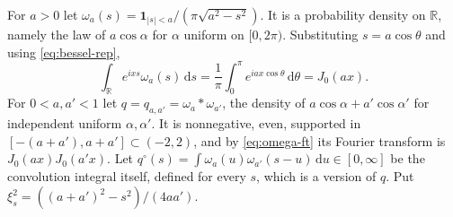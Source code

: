 \documentclass[preprint,12pt,a4paper]{elsarticle}
\theoremstyle{remark}
\newcommand{\R}{\mathbb R}
\newcommand{\dd}{\,\mathrm d}
\begin{document}
For $a>0$ let $\omega_a(s)=\boldsymbol1_{|s|<a}/(\pi\sqrt{a^2-s^2})$. It is
a probability density on $\R$, namely the law of $a\cos\alpha$ for $\alpha$
uniform on $[0,2\pi)$. Substituting $s=a\cos\theta$ and using \eqref{eq:bessel-rep},
\begin{equation}\label{eq:omega-ft}
 \int_\R e^{ixs}\omega_a(s)\dd s=\frac1\pi\int_0^\pi e^{iax\cos\theta}\dd\theta=J_0(ax).
\end{equation}
For $0<a,a'<1$ let $q=q_{a,a'}=\omega_a*\omega_{a'}$, the density of
$a\cos\alpha+a'\cos\alpha'$ for independent uniform $\alpha,\alpha'$. It is
nonnegative, even, supported in $[-(a+a'),a+a']\subset(-2,2)$, and by
\eqref{eq:omega-ft} its Fourier transform is $J_0(ax)J_0(a'x)$. Let
$q^\circ(s)=\int\omega_a(u)\omega_{a'}(s-u)\dd u\in[0,\infty]$ be the convolution integral
itself, defined for every $s$, which is a version of $q$. Put
$\xi_s^2=((a+a')^2-s^2)/(4aa')$.
\end{document}
